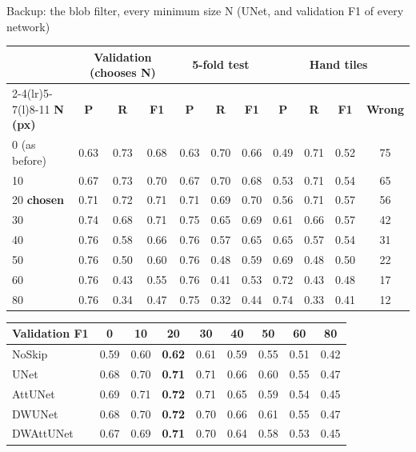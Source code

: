 \begin{frame}{Backup: the blob filter, every minimum size N (UNet, and validation F1 of every network)}
  \centering\scriptsize
  \renewcommand{\arraystretch}{1.05}\setlength{\tabcolsep}{3.5pt}
\begin{tabular}{@{}lcccccccccc@{}}
\toprule
& \multicolumn{3}{c}{\textbf{Validation (chooses N)}} & \multicolumn{3}{c}{\textbf{5-fold test}} & \multicolumn{4}{c}{\textbf{Hand tiles}} \\ \cmidrule(lr){2-4}\cmidrule(lr){5-7}\cmidrule(l){8-11}
\textbf{N (px)} & \textbf{P} & \textbf{R} & \textbf{F1} & \textbf{P} & \textbf{R} & \textbf{F1} & \textbf{P} & \textbf{R} & \textbf{F1} & \textbf{Wrong} \\
\midrule
0 (as before) & 0.63 & 0.73 & 0.68 & 0.63 & 0.70 & 0.66 & 0.49 & 0.71 & 0.52 & 75 \\
10 & 0.67 & 0.73 & 0.70 & 0.67 & 0.70 & 0.68 & 0.53 & 0.71 & 0.54 & 65 \\
20 \textbf{chosen} & 0.71 & 0.72 & 0.71 & 0.71 & 0.69 & 0.70 & 0.56 & 0.71 & 0.57 & 56 \\
30 & 0.74 & 0.68 & 0.71 & 0.75 & 0.65 & 0.69 & 0.61 & 0.66 & 0.57 & 42 \\
40 & 0.76 & 0.58 & 0.66 & 0.76 & 0.57 & 0.65 & 0.65 & 0.57 & 0.54 & 31 \\
50 & 0.76 & 0.50 & 0.60 & 0.76 & 0.48 & 0.59 & 0.69 & 0.48 & 0.50 & 22 \\
60 & 0.76 & 0.43 & 0.55 & 0.76 & 0.41 & 0.53 & 0.72 & 0.43 & 0.48 & 17 \\
80 & 0.76 & 0.34 & 0.47 & 0.75 & 0.32 & 0.44 & 0.74 & 0.33 & 0.41 & 12 \\
\bottomrule
\end{tabular}

  \vspace{3mm}
\begin{tabular}{@{}lcccccccc@{}}
\toprule
\textbf{Validation F1} & \textbf{0} & \textbf{10} & \textbf{20} & \textbf{30} & \textbf{40} & \textbf{50} & \textbf{60} & \textbf{80} \\
\midrule
NoSkip & 0.59 & 0.60 & \textbf{0.62} & 0.61 & 0.59 & 0.55 & 0.51 & 0.42 \\
UNet & 0.68 & 0.70 & \textbf{0.71} & 0.71 & 0.66 & 0.60 & 0.55 & 0.47 \\
AttUNet & 0.69 & 0.71 & \textbf{0.72} & 0.71 & 0.65 & 0.59 & 0.54 & 0.45 \\
DWUNet & 0.68 & 0.70 & \textbf{0.72} & 0.70 & 0.66 & 0.61 & 0.55 & 0.47 \\
DWAttUNet & 0.67 & 0.69 & \textbf{0.71} & 0.70 & 0.64 & 0.58 & 0.53 & 0.45 \\
\bottomrule
\end{tabular}
  \vfill
\end{frame}


